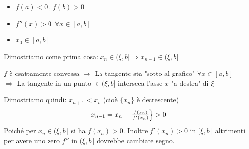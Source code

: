 \begin{itemize}
	\item $f(a)<0\,,\, f(b)>0$
	\item $f''(x)>0\,\,\, \forall x\in [a,b]$
	\item $x_0\in [a,b]$
\end{itemize}
Dimostriamo come prima cosa: $x_n\in (\xi,b] \Rightarrow x_{n+1}\in (\xi,b]$
\begin{center}
	$f$ è esattamente convessa $\Rightarrow$ La tangente sta "sotto al grafico" $\forall x\in [a,b]$ \\$\Rightarrow $ La tangente in un punto $\in (\xi,b]$ interseca l'asse $x$ "a destra" di $\xi$
\end{center}
Dimostriamo quindi: $x_{n+1}<x_n$ (cioè $\{x_n\}$ è decrescente) 
\[
x_{n+1} = x_n - 
\begin{rcases}
\frac{f(x_n)}{f'(x_n)}
\end{rcases}
>0
\]
Poiché per $x_n \in (\xi,b\,]$ si ha $f(x_n)>0$. Inoltre $f'(x_n)>0$ in $(\xi,b\,]$ altrimenti per avere uno zero $f''$ in $(\xi,b\,]$ dovrebbe cambiare segno.


